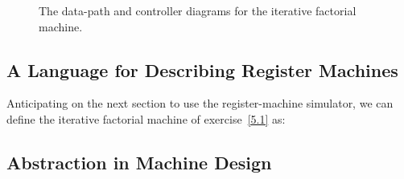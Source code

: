 \begin{exe}[5.1]
\begin{figure}
        \caption{The data-path and controller diagrams for the iterative 
        factorial machine.}
        \label{5.1fig}
    \end{figure}
\end{exe}

\subsection{A Language for Describing Register Machines}

\begin{exe}[5.2]
    Anticipating on the next section to use the register-machine simulator, we 
    can define the iterative factorial machine of exercise~\ref{5.1} as:
\end{exe}

\subsection{Abstraction in Machine Design}

